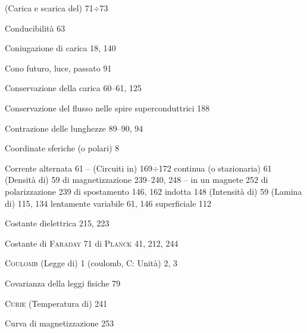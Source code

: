 \begin{theindex}
    \subitem (Carica e scarica del) 71$\div$73
  \item Conducibilit\`a 63
  \item Coniugazione di carica 18, 140
  \item Cono futuro, luce, passato 91
  \item Conservazione della carica 60--61, 125
  \item Conservazione del flusso nelle spire superconduttrici 188
  \item Contrazione delle lunghezze 89--90, 94
  \item Coordinate sferiche (o polari) 8
  \item Corrente
    \subitem alternata 61
    \subitem -- (Circuiti in) 169$\div$172
    \subitem continua (o stazionaria) 61
    \subitem (Densit\`a di) 59
    \subitem di magnetizzazione 239--240, 248
    \subitem -- in un magnete 252
    \subitem di polarizzazione 239
    \subitem di spostamento 146, 162
    \subitem indotta 148
    \subitem (Intensit\`a di) 59
    \subitem (Lamina di) 115, 134
    \subitem lentamente variabile 61, 146
    \subitem superficiale 112
  \item Costante dielettrica 215, 223
  \item Costante di \textsc{Faraday} 71
    \subitem di \textsc{Planck} 41, 212, 244
  \item \textsc{Coulomb} (Legge di) 1
    \subitem (coulomb, C: Unit\`a) 2, 3
  \item Covarianza della leggi fisiche 79
  \item \textsc{Curie} (Temperatura di) 241
  \item Curva di magnetizzazione 253


\end{theindex}
